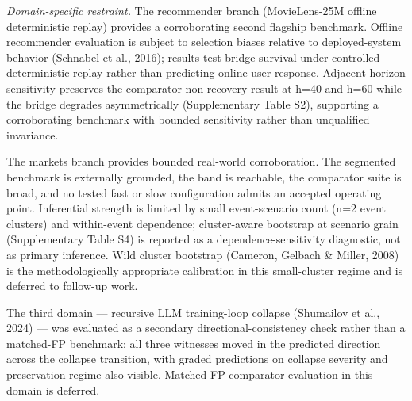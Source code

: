 \documentclass[
  11pt,
]{article}
\begin{document}
\emph{Domain-specific restraint.} The recommender branch (MovieLens-25M
offline deterministic replay) provides a corroborating second flagship
benchmark. Offline recommender evaluation is subject to selection biases
relative to deployed-system behavior (Schnabel et al., 2016); results
test bridge survival under controlled deterministic replay rather than
predicting online user response. Adjacent-horizon sensitivity preserves
the comparator non-recovery result at h=40 and h=60 while the bridge
degrades asymmetrically (Supplementary Table S2), supporting a
corroborating benchmark with bounded sensitivity rather than unqualified
invariance.

The markets branch provides bounded real-world corroboration. The
segmented benchmark is externally grounded, the band is reachable, the
comparator suite is broad, and no tested fast or slow configuration
admits an accepted operating point. Inferential strength is limited by
small event-scenario count (n=2 event clusters) and within-event
dependence; cluster-aware bootstrap at scenario grain (Supplementary
Table S4) is reported as a dependence-sensitivity diagnostic, not as
primary inference. Wild cluster bootstrap (Cameron, Gelbach \& Miller,
2008) is the methodologically appropriate calibration in this
small-cluster regime and is deferred to follow-up work.

The third domain --- recursive LLM training-loop collapse (Shumailov et
al., 2024) --- was evaluated as a secondary directional-consistency
check rather than a matched-FP benchmark: all three witnesses moved in
the predicted direction across the collapse transition, with graded
predictions on collapse severity and preservation regime also visible.
Matched-FP comparator evaluation in this domain is deferred.
\end{document}
